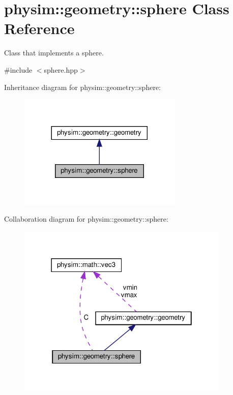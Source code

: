 \hypertarget{classphysim_1_1geometry_1_1sphere}{}\section{physim\+:\+:geometry\+:\+:sphere Class Reference}
\label{classphysim_1_1geometry_1_1sphere}


Class that implements a sphere.  




{\ttfamily \#include $<$sphere.\+hpp$>$}



Inheritance diagram for physim\+:\+:geometry\+:\+:sphere\+:\nopagebreak
\begin{figure}[H]
\begin{center}
\leavevmode
\includegraphics[width=221pt]{classphysim_1_1geometry_1_1sphere__inherit__graph}
\end{center}
\end{figure}


Collaboration diagram for physim\+:\+:geometry\+:\+:sphere\+:
\nopagebreak
\begin{figure}[H]
\begin{center}
\leavevmode
\includegraphics[width=286pt]{classphysim_1_1geometry_1_1sphere__coll__graph}
\end{center}
\end{figure}
